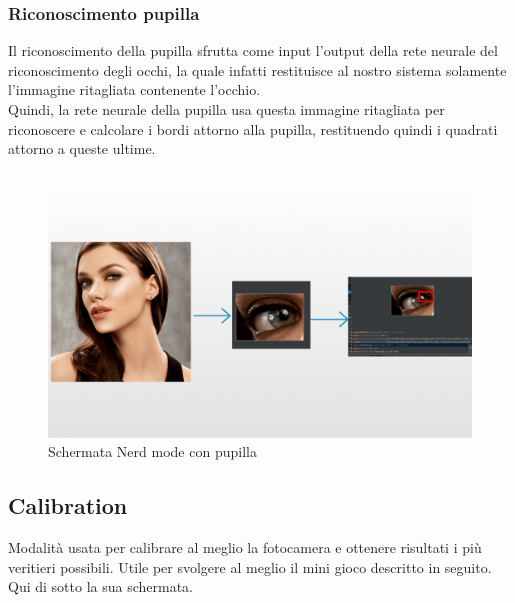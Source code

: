 \documentclass[11pt]{article}
\begin{document}
\subsubsection{Riconoscimento pupilla}
Il riconoscimento della pupilla sfrutta come input l'output della rete neurale del riconoscimento degli occhi, la quale infatti restituisce al nostro sistema solamente l'immagine ritagliata contenente l'occhio.\\ Quindi, la rete neurale della pupilla usa questa immagine ritagliata per riconoscere e calcolare i bordi attorno alla pupilla, restituendo quindi i quadrati attorno a queste ultime.
\begin{figure}[h]
\caption{Schermata Nerd mode con pupilla }
\centering
\includegraphics[scale=0.25]{img/gazeAndroid.png}
\end{figure}

\newpage
\subsection{Calibration}
Modalità usata per calibrare al meglio la fotocamera e ottenere risultati i più veritieri possibili. Utile per svolgere al meglio il mini gioco descritto in seguito. Qui di sotto la sua schermata.
\end{document}
